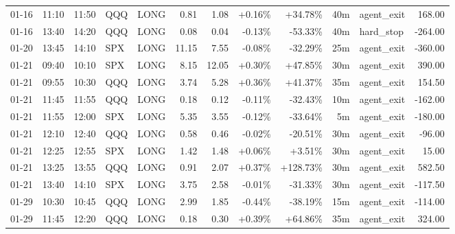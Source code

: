 \documentclass[11pt,a4paper,twoside]{article}
\begin{document}
\begin{center}
\begin{longtable}{>{\color{txtmain}}l l l l l r r r r r >{\color{txtmain}}l r}
01-16 & 11:10 & 11:50 & QQQ & LONG & 0.81 & 1.08 & \textcolor{wingreen}{+0.16\%} & \textcolor{wingreen}{+34.78\%} & 40m & agent\_exit & \textcolor{wingreen}{168.00} \\
01-16 & 13:40 & 14:20 & QQQ & LONG & 0.08 & 0.04 & \textcolor{lossred}{-0.13\%} & \textcolor{lossred}{-53.33\%} & 40m & hard\_stop & \textcolor{lossred}{-264.00} \\
01-20 & 13:45 & 14:10 & SPX & LONG & 11.15 & 7.55 & \textcolor{lossred}{-0.08\%} & \textcolor{lossred}{-32.29\%} & 25m & agent\_exit & \textcolor{lossred}{-360.00} \\
01-21 & 09:40 & 10:10 & SPX & LONG & 8.15 & 12.05 & \textcolor{wingreen}{+0.30\%} & \textcolor{wingreen}{+47.85\%} & 30m & agent\_exit & \textcolor{wingreen}{390.00} \\
01-21 & 09:55 & 10:30 & QQQ & LONG & 3.74 & 5.28 & \textcolor{wingreen}{+0.36\%} & \textcolor{wingreen}{+41.37\%} & 35m & agent\_exit & \textcolor{wingreen}{154.50} \\
01-21 & 11:45 & 11:55 & QQQ & LONG & 0.18 & 0.12 & \textcolor{lossred}{-0.11\%} & \textcolor{lossred}{-32.43\%} & 10m & agent\_exit & \textcolor{lossred}{-162.00} \\
01-21 & 11:55 & 12:00 & SPX & LONG & 5.35 & 3.55 & \textcolor{lossred}{-0.12\%} & \textcolor{lossred}{-33.64\%} & 5m & agent\_exit & \textcolor{lossred}{-180.00} \\
01-21 & 12:10 & 12:40 & QQQ & LONG & 0.58 & 0.46 & \textcolor{lossred}{-0.02\%} & \textcolor{lossred}{-20.51\%} & 30m & agent\_exit & \textcolor{lossred}{-96.00} \\
01-21 & 12:25 & 12:55 & SPX & LONG & 1.42 & 1.48 & \textcolor{wingreen}{+0.06\%} & \textcolor{wingreen}{+3.51\%} & 30m & agent\_exit & \textcolor{wingreen}{15.00} \\
01-21 & 13:25 & 13:55 & QQQ & LONG & 0.91 & 2.07 & \textcolor{wingreen}{+0.37\%} & \textcolor{wingreen}{+128.73\%} & 30m & agent\_exit & \textcolor{wingreen}{582.50} \\
01-21 & 13:40 & 14:10 & SPX & LONG & 3.75 & 2.58 & \textcolor{lossred}{-0.01\%} & \textcolor{lossred}{-31.33\%} & 30m & agent\_exit & \textcolor{lossred}{-117.50} \\
01-29 & 10:30 & 10:45 & QQQ & LONG & 2.99 & 1.85 & \textcolor{lossred}{-0.44\%} & \textcolor{lossred}{-38.19\%} & 15m & agent\_exit & \textcolor{lossred}{-114.00} \\
01-29 & 11:45 & 12:20 & QQQ & LONG & 0.18 & 0.30 & \textcolor{wingreen}{+0.39\%} & \textcolor{wingreen}{+64.86\%} & 35m & agent\_exit & \textcolor{wingreen}{324.00} \\

\end{longtable}
\end{center}
\end{document}
